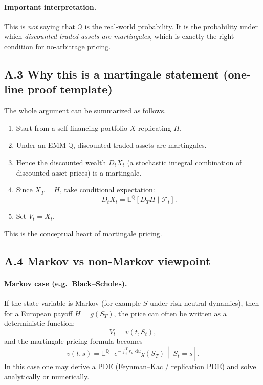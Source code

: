 \documentclass[11pt]{article}
\newcommand{\Qbb}{\mathbb{Q}}
\newcommand{\E}{\mathbb{E}}
\newcommand{\dd}{\,\mathrm{d}}
\newcommand{\1}{\mathbf{1}}
\begin{document}
\paragraph{Important interpretation.}
This is \emph{not} saying that \(\Qbb\) is the real-world probability.
It is the probability under which \emph{discounted traded assets are martingales},
which is exactly the right condition for no-arbitrage pricing.

\subsection*{A.3 Why this is a martingale statement (one-line proof template)}

The whole argument can be summarized as follows.

\begin{enumerate}[leftmargin=1.6em]
    \item Start from a self-financing portfolio \(X\) replicating \(H\).
    \item Under an EMM \(\Qbb\), discounted traded assets are martingales.
    \item Hence the discounted wealth \(D_tX_t\) (a stochastic integral combination of discounted asset prices) is a martingale.
    \item Since \(X_T=H\), take conditional expectation:
    $$
    D_tX_t=\E^{\Qbb}[D_TH\mid\mathcal F_t].
    $$
    \item Set \(V_t=X_t\).
\end{enumerate}

This is the conceptual heart of martingale pricing.

\subsection*{A.4 Markov vs non-Markov viewpoint}

\paragraph{Markov case (e.g.\ Black--Scholes).}
If the state variable is Markov (for example \(S\) under risk-neutral dynamics), then for a European payoff \(H=g(S_T)\),
the price can often be written as a deterministic function:
$$
V_t = v(t,S_t),
$$
and the martingale pricing formula becomes
$$
v(t,s)=\E^{\Qbb}\!\left[e^{-\int_t^T r_u\,\dd u}g(S_T)\,\middle|\,S_t=s\right].
$$
In this case one may derive a PDE (Feynman--Kac / replication PDE) and solve analytically or numerically.
\end{document}

